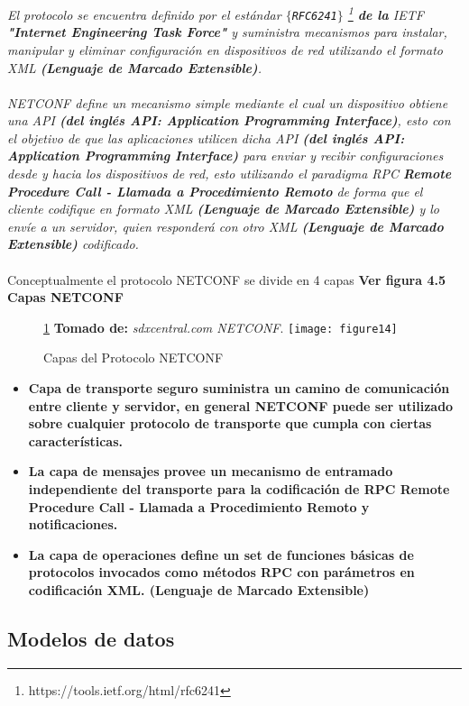 \textit{El protocolo se encuentra definido por el estándar \texttt{$\{$RFC6241$\}$} 
\footnote{https://tools.ietf.org/html/rfc6241} \textbf{de la}  IETF \textbf{"Internet Engineering Task Force"} y suministra mecanismos para instalar, manipular y eliminar configuración en dispositivos de red utilizando el formato XML \textbf{ (Lenguaje de Marcado Extensible)}.
\\
\\
NETCONF define un mecanismo simple mediante el cual un dispositivo obtiene una API \textbf{(del inglés API: Application Programming Interface)}, esto con el objetivo de que las aplicaciones utilicen dicha API \textbf{(del inglés API: Application Programming Interface)} para enviar y recibir configuraciones desde y hacia los dispositivos de red, esto utilizando el paradigma RPC \textbf{Remote Procedure Call - Llamada a Procedimiento Remoto} de forma que el cliente codifique en formato XML \textbf{(Lenguaje de Marcado Extensible)} y lo envíe a un servidor, quien responderá con otro XML \textbf{ (Lenguaje de Marcado Extensible)} codificado.}
\\
\\
Conceptualmente el protocolo NETCONF se divide en 4 capas \textbf{Ver figura 4.5 Capas NETCONF}
\begin{figure}[htbp]
 \ref{fig:netconf} \textbf{Tomado de:} \textit{sdxcentral.com NETCONF}.
  \centering
    {\texttt{[image: figure14]}}
  \caption{Capas del Protocolo NETCONF}
  \label{fig:netconf}
\end{figure}

\begin{itemize}
\item\textbf{Capa de transporte seguro suministra un camino de comunicación entre cliente y servidor, en general NETCONF puede ser utilizado sobre cualquier protocolo de transporte que cumpla con ciertas características.
}
\item\textbf{La capa de mensajes provee un mecanismo de entramado independiente del transporte para la codificación de RPC \textbf{Remote Procedure Call - Llamada a Procedimiento Remoto} y notificaciones.}
\item\textbf{La capa de operaciones define un set de funciones básicas de protocolos invocados como métodos RPC con parámetros en codificación XML. \textbf{(Lenguaje de Marcado Extensible)}}
\end{itemize}


\subsection{Modelos de datos}
\label{sec:Modelos de datos}

